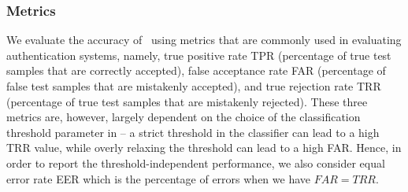 \subsubsection{Metrics}
We evaluate the accuracy of \systemname~using metrics that are commonly used in evaluating authentication systems, namely,
true positive rate TPR (percentage of true test samples that are
correctly accepted), false acceptance rate FAR (percentage of false test samples that are
mistakenly accepted), and true rejection rate TRR (percentage of true test
samples that are mistakenly rejected). These three metrics are, however, largely dependent on the choice of the classification threshold  parameter in \systemname --
a strict threshold in the classifier can lead to a high TRR value, while
overly relaxing the threshold can lead to a high FAR. Hence, in order to report the threshold-independent performance, we also consider equal error rate EER which is the percentage of errors when we have $FAR = TRR$. 



